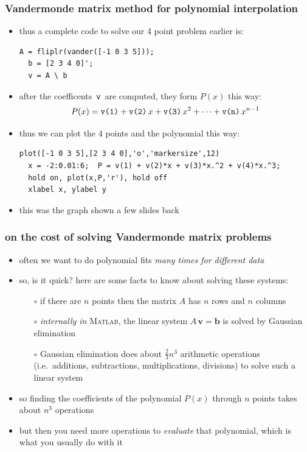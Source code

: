 \documentclass[10pt,hyperref]{beamer}
\newcommand{\bb}{\mathbf{b}}
\newcommand{\bv}{\mathbf{v}}
\newcommand{\Matlab}{\textsc{Matlab}\xspace}
\newcommand{\MO}{\Matlab}
\begin{document}
\begin{frame}[fragile]
\frametitle{Vandermonde matrix method for polynomial interpolation}

\begin{itemize}
\item thus a complete code to solve our 4 point problem earlier is:

\bigskip
\begin{Verbatim}[frame=single,fontfamily=courier,fontsize=\scriptsize]
  A = fliplr(vander([-1 0 3 5]));
  b = [2 3 4 0]';
  v = A \ b
\end{Verbatim}
\bigskip

\item after the coefficents\, \texttt{v}\, are computed, they form $P(x)$ this way:
	$$P(x) = \text{\texttt{v(1)}} + \text{\texttt{v(2)}}\, x + \text{\texttt{v(3)}}\, x^2 + \dots + \text{\texttt{v(n)}}\, x^{n-1}$$

\item thus we can plot the 4 points and the polynomial this way:
\bigskip
\begin{Verbatim}[frame=single,fontfamily=courier,fontsize=\scriptsize]
  plot([-1 0 3 5],[2 3 4 0],'o','markersize',12)
  x = -2:0.01:6;  P = v(1) + v(2)*x + v(3)*x.^2 + v(4)*x.^3;
  hold on, plot(x,P,'r'), hold off
  xlabel x, ylabel y
\end{Verbatim}
\bigskip

\item this was the graph shown a few slides back
\end{itemize}
\end{frame}


\begin{frame}[fragile]
\frametitle{on the cost of solving Vandermonde matrix problems}

\begin{itemize}
\item often we want to do polynomial fits \emph{many times for different data}
\item so, is it quick?  here are some facts to know about solving these systems:
  \begin{itemize}
  \item[$\circ$] if there are $n$ points then the matrix $A$ has $n$ rows and $n$ columns
  \item[$\circ$] \emph{internally in} \MO, the linear system $A\,\bv=\bb$ is solved by Gaussian elimination
  \item[$\circ$] Gaussian elimination does about $\frac{2}{3} n^3$ arithmetic operations (i.e.~additions, subtractions, multiplications, divisions) to solve such a linear system
  \end{itemize}
\item so finding the coefficients of the polynomial $P(x)$ through $n$ points takes about $n^3$ operations
\item but then you need more operations to \emph{evaluate} that polynomial, which is what you usually do with it
\end{itemize}
\end{frame}
\end{document}
